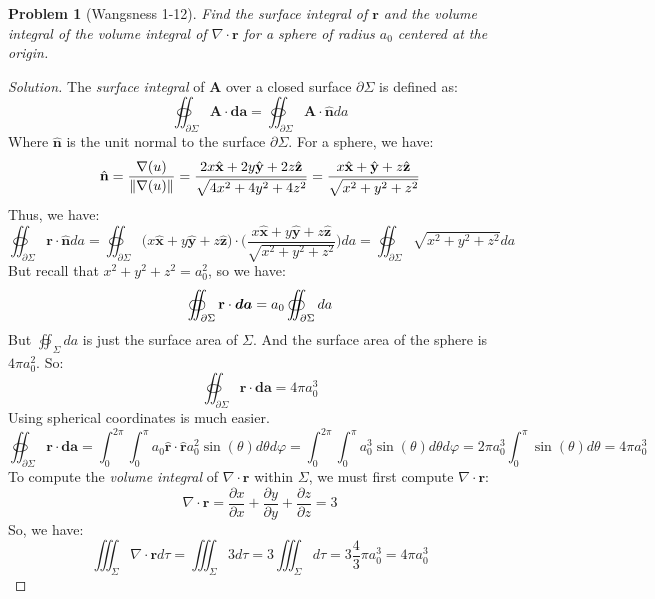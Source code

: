 \documentclass[oneside]{book}
\theoremstyle{mystyle}
\newtheorem{problem}{Problem}[section]
\DeclarePairedDelimiter\norm{\lVert}{\rVert}
\begin{document}
\begin{problem}[Wangsness 1-12]
\label{problem:EMAG_1_wangsness_1_12}
Find the surface integral of $\mathbf{r}$ and the volume integral of the volume integral of $\nabla \cdot \mathbf{r}$ for a sphere of radius $a_{0}$ centered at the origin.
\end{problem}
\begin{proof}[Solution]
The \textit{surface integral} of $\mathbf{A}$ over a closed surface $\partial\Sigma$ is defined as:
\begin{equation*}
    \oiint_{\partial\Sigma} \mathbf{A}\cdot\boldsymbol{da} = \oiint_{\partial\Sigma}\mathbf{A}\cdot\hat{\boldsymbol{n}}da
\end{equation*}
Where $\hat{\mathbf{n}}$ is the unit normal to the surface $\partial\Sigma$. For a sphere, we have:
\begin{equation*}
    \hat{\mathbf{n}}=\frac{\nabla(u)}{\norm{\nabla(u)}}=\frac{2x\hat{\mathbf{x}}+2y\hat{\mathbf{y}}+2z\hat{\mathbf{z}}}{\sqrt{4x^{2}+4y^{2}+4z^{2}}}= \frac{x\hat{\mathbf{x}}+\hat{\mathbf{y}}+z\hat{\mathbf{z}}}{\sqrt{x^2+y^2+z^2}}
\end{equation*}
Thus, we have:
\begin{equation*}
    \oiint_{\partial\Sigma}\mathbf{r}\cdot\hat{\mathbf{n}}da=\oiint_{\partial\Sigma}\bigg(x\hat{\mathbf{x}}+y\hat{\mathbf{y}}+z\hat{\mathbf{z}}\bigg)\cdot \bigg(\frac{x\hat{\mathbf{x}}+y\hat{\mathbf{y}}+z\hat{\mathbf{z}}}{\sqrt{x^{2}+y^{2}+z^{2}}}\bigg)da=\oiint_{\partial\Sigma}\sqrt{x^{2}+y^{2}+z^{2}}da
\end{equation*}
But recall that $x^{2}+y^{2}+z^{2} = a_{0}^{2}$, so we have:
\begin{equation*}
    \oiint_{\partial\Sigma}\mathbf{r}\cdot\boldsymbol{da} = a_{0}\oiint_{\partial\Sigma}da\\
\end{equation*}
But $\oiint_{\Sigma}da$ is just the surface area of $\Sigma$. And the surface area of the sphere is $4\pi a_{0}^{2}$. So:
\begin{equation*}
    \oiint_{\partial\Sigma}\mathbf{r}\cdot \boldsymbol{da} = 4\pi a_{0}^{3}
\end{equation*}
Using spherical coordinates is much easier.
\begin{equation*}
    \oiint_{\partial\Sigma}\mathbf{r}\cdot\boldsymbol{da}=\int_{0}^{2\pi}\int_{0}^{\pi}a_{0}\hat{\mathbf{r}}\cdot\hat{\mathbf{r}}a_{0}^{2}\sin(\theta)d\theta d\varphi= \int_{0}^{2\pi}\int_{0}^{\pi}a_{0}^{3}\sin(\theta)d\theta d\varphi=2\pi a_{0}^{3} \int_{0}^{\pi}\sin(\theta)d\theta=4\pi a_{0}^{3}
\end{equation*}
To compute the \textit{volume integral} of $\nabla \cdot \mathbf{r}$ within $\Sigma$, we must first compute $\nabla\cdot \mathbf{r}$:
\begin{equation*}
    \nabla\cdot\mathbf{r}=\frac{\partial x}{\partial x}+\frac{\partial y}{\partial y}+\frac{\partial z}{\partial z}=3
\end{equation*}
So, we have:
\begin{equation*}
    \iiint_{\Sigma}\nabla\cdot\mathbf{r}d\tau=\iiint_{\Sigma}3d\tau=3\iiint_{\Sigma}d\tau=3\frac{4}{3}\pi a_{0}^{3}=4\pi a_{0}^{3}
\end{equation*}
\end{proof}
\end{document}
